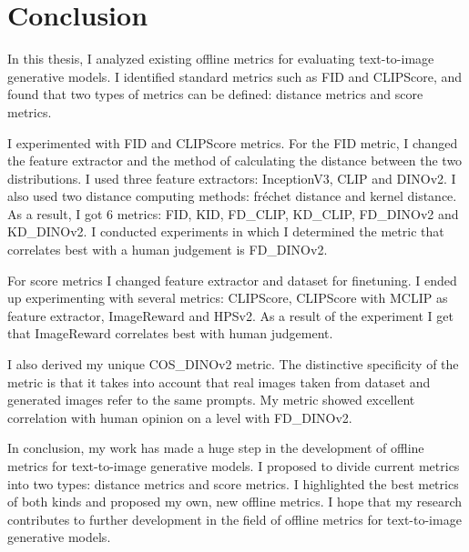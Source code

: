 \chapter{Conclusion}
\label{chap:conclusion}
In this thesis, I analyzed existing offline metrics for evaluating text-to-image generative models. I identified standard metrics such as FID and CLIPScore, and found that two types of metrics can be defined: distance metrics and score metrics.

I experimented with FID and CLIPScore metrics. For the FID metric, I changed the feature extractor and the method of calculating the distance between the two distributions. I used three feature extractors: InceptionV3, CLIP and DINOv2. I also used two distance computing methods: fréchet distance and kernel distance. As a result, I got 6 metrics: FID\cite{FID}, KID, FD\_CLIP, KD\_CLIP\cite{KD_CLIP}, FD\_DINOv2\cite{FD_DINOv2} and KD\_DINOv2. I conducted experiments in which I determined the metric that correlates best with a human judgement is FD\_DINOv2.

For score metrics I changed feature extractor and dataset for finetuning. I ended up experimenting with several metrics: CLIPScore\cite{CLIPScore}, CLIPScore with MCLIP as feature extractor, ImageReward\cite{Image_reward} and HPSv2\cite{HPSv2}. As a result of the experiment I get that ImageReward correlates best with human judgement.

I also derived my unique COS\_DINOv2 metric. The distinctive specificity of the metric is that it takes into account that real images taken from dataset and generated images refer to the same prompts. My metric showed excellent correlation with human opinion on a level with FD\_DINOv2.


In conclusion, my work has made a huge step in the development of offline metrics for text-to-image generative models. I proposed to divide current metrics into two types: distance metrics and score metrics. I highlighted the best metrics of both kinds and proposed my own, new offline metrics. I hope that my research contributes to further development in the field of offline metrics for text-to-image generative models.